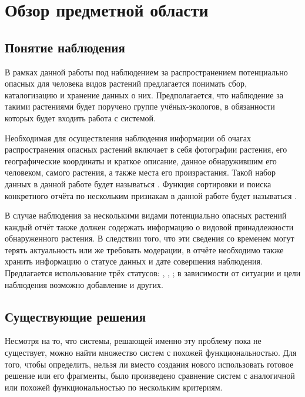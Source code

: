 
\section{Обзор предметной области}

\subsection{Понятие наблюдения}

\tab
В рамках данной работы под наблюдением за распространением потенциально опасных для человека видов растений предлагается понимать сбор, каталогизацию и хранение данных о них.
Предполагается, что наблюдение за такими растениями будет поручено группе учёных-экологов, в обязанности которых будет входить работа с системой.

\tab
Необходимая для осуществления наблюдения информации об очагах распространения опасных растений включает в себя фотографии растения, его географические координаты и краткое описание, данное обнаружившим его человеком, самого растения, а также места его произрастания.
Такой набор данных в данной работе будет называться .
Функция сортировки и поиска конкретного отчёта по нескольким признакам в данной работе будет называться .

\tab
В случае наблюдения за несколькими видами потенциально опасных растений каждый отчёт также должен содержать информацию о видовой принадлежности обнаруженного растения.
В следствии того, что эти сведения со временем могут терять актуальность или же требовать модерации, в отчёте необходимо также хранить информацию о статусе данных и дате совершения наблюдения.
Предлагается использование трёх статусов: , , ; в зависимости от ситуации и цели наблюдения возможно добавление и других.

\subsection{Существующие решения}

\tab
Несмотря на то, что системы, решающей именно эту проблему пока не существует, можно найти множество систем с похожей функциональностью.
Для того, чтобы определить, нельзя ли вместо создания нового использовать готовое решение или его фрагменты, было произведено сравнение систем с аналогичной или похожей функциональностью по нескольким критериям.

